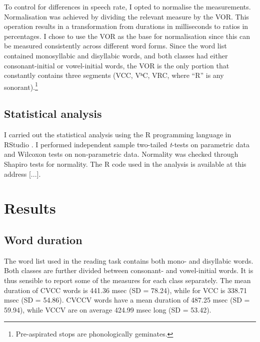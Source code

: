 \documentclass[11pt,a4paper,openany]{memoir}\usepackage[]{graphicx}\usepackage[]{color}
\begin{document}
To control for differences in speech rate, I opted to normalise the measurements.
Normalisation was achieved by dividing the relevant measure by the VOR.
This operation results in a transformation from durations in milliseconds to ratios in percentages.
I chose to use the VOR as the base for normalisation since this can be measured consistently across different word forms.
Since the word list contained monosyllabic and disyllabic words, and both classes had either consonant-initial or vowel-initial words, the VOR is the only portion that constantly contains three segments (VCC, VʰC, VRC, where ``R'' is any sonorant).\footnote{Pre-aspirated stops are phonologically geminates.}

\section{Statistical analysis}
\label{s:stats}
I carried out the statistical analysis using the R programming language \citep{r-core-team2015} in RStudio \citep{rstudio-team2015}.
I performed independent sample two-tailed \textit{t}-tests on parametric data and Wilcoxon tests on non-parametric data.
Normality was checked through Shapiro tests for normality.
The R code used in the analysis is available at this address [...].













\chapter{Results}
\label{c:results}

\section{Word duration}

The word list used in the reading task contains both mono- and disyllabic words.
Both classes are further divided between consonant- and vowel-initial words.
It is thus sensible to report some of the measures for each class separately.
The mean duration of CVCC words is 441.36 msec (SD = 78.24), while for VCC is 338.71 msec (SD = 54.86).
CVCCV words have a mean duration of 487.25 msec (SD = 59.94), while VCCV are on average 424.99 msec long (SD = 53.42).
\end{document}
